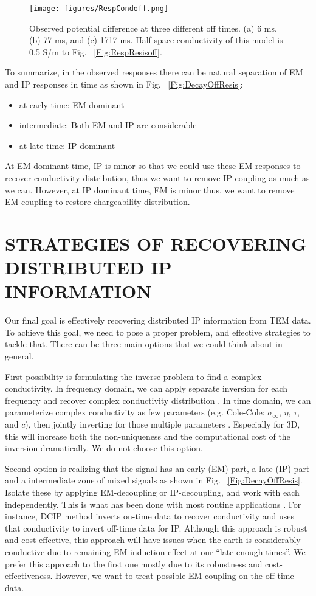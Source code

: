 \documentclass[letterpaper,11pt]{article}
\newcommand{\siginf}{\sigma_\infty}
\begin{document}
\begin{figure}[htb]
  \centering
  \texttt{[image: figures/RespCondoff.png]}
  \caption{Observed potential difference at three different off times. (a) 6 ms, (b) 77 ms, and (c) 1717 ms. Half-space conductivity of this model is 0.5 S/m to Fig. ~\ref{Fig:RespResisoff}.}
  \label{Fig:RespCondoff}
\end{figure}

To summarize, in the observed responses there can be natural separation of EM and IP responses in time as shown in Fig. ~\ref{Fig:DecayOffResis}:
\begin{itemize}
  \item at early time: EM dominant
  \item intermediate: Both EM and IP are considerable
  \item at late time: IP dominant
\end{itemize}
At EM dominant time, IP is minor so that we could use these EM responses to recover conductivity distribution, thus we want to remove IP-coupling as much as we can. However, at IP dominant time, EM is minor thus, we want to remove EM-coupling to restore chargeability distribution.  
\clearpage

\section{STRATEGIES OF RECOVERING DISTRIBUTED IP INFORMATION}
Our final goal is effectively recovering distributed IP information from TEM data. To achieve this goal, we need to pose a proper problem, and effective strategies to tackle that. There can be three main options that we could think about in general. 

First possibility is formulating the inverse problem to find a complex conductivity. In frequency domain, we can apply separate inversion for each frequency and recover complex conductivity distribution \cite[]{commer2011}. In time domain, we can parameterize complex conductivity as few parameters (e.g. Cole-Cole: $\siginf$, $\eta$, $\tau$, and $c$), then jointly inverting for those multiple parameters \cite[]{Marchant2013}. Especially for 3D, this will increase both the non-uniqueness and the computational cost of the inversion dramatically. We do not choose this option. 

Second option is realizing that the signal has an early (EM) part, a late (IP) part and a intermediate zone of mixed signals as shown in Fig. ~\ref{Fig:DecayOffResis}. Isolate these by applying EM-decoupling or IP-decoupling, and work with each independently. This is what has been done with most routine applications \cite[]{doug1994}. For instance, DCIP method inverts on-time data to recover conductivity and uses that conductivity to invert off-time data for IP. Although this approach is robust and cost-effective, this approach will have issues when the earth is considerably conductive due to remaining EM induction effect at our ``late enough times''. 
We prefer this approach to the first one mostly due to its robustness and cost-effectiveness. However, we want to treat possible EM-coupling on the off-time data. 
\end{document}
